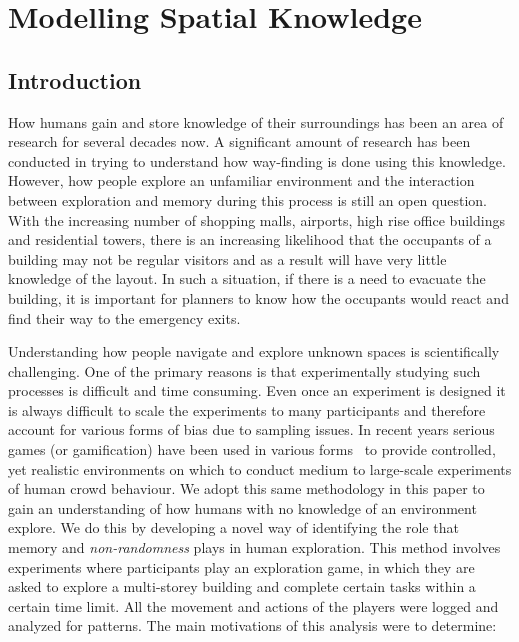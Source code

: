 
\chapter{Modelling Spatial Knowledge}
\label{chapter:PreEvacuationBehavior}

\section{Introduction}
\label{intro}

How humans gain and store knowledge of their surroundings has been an area of research for several decades now. A significant amount of research has been conducted in trying to understand how way-finding is done using this knowledge. However, how people explore an unfamiliar environment and the interaction between exploration and memory during this process is still an open question. With the increasing number of shopping malls, airports, high rise office buildings and residential towers, there is an increasing likelihood that the occupants of a building may not be regular visitors and as a result will have very little knowledge of the layout. In such a situation, if there is a need to evacuate the building, it is important for planners to know how the occupants would react and find their way to the emergency exits.

Understanding how people navigate and explore unknown spaces is scientifically challenging. One of the primary reasons is that experimentally studying such processes  is difficult and time consuming. Even once an experiment is designed it is always difficult to scale the experiments to many participants and therefore account for various forms of bias due to sampling issues. In recent years serious games (or gamification) have been used in various forms~\cite{npelechano:2008ug, Anonymous:2011ba, Bode06022014} to  provide controlled, yet realistic environments on which to conduct medium to large-scale experiments of human crowd behaviour. We adopt this same methodology in this paper to gain an understanding of how humans with no knowledge of an environment explore. We do this by developing a novel way of identifying the role that memory and {\em non-randomness} plays in human exploration. This method involves experiments where participants play an exploration game, in which they are asked to explore a multi-storey building and complete certain tasks within a certain time limit. All the movement and actions of the players were logged and analyzed for patterns. The main motivations of this analysis were to determine:

